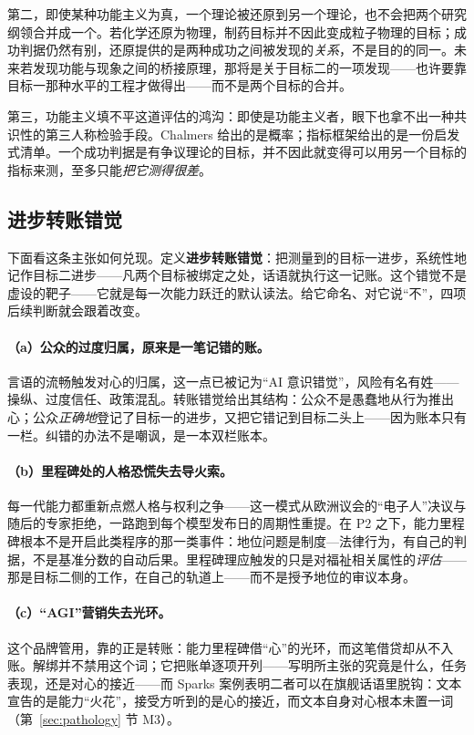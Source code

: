 \documentclass[10pt,fontset=fandol]{ctexart}
\begin{document}
第二，即使某种功能主义为真，一个理论被还原到另一个理论，也不会把两个研究纲领合并成一个。若化学还原为物理，制药目标并不因此变成粒子物理的目标；成功判据仍然有别，还原提供的是两种成功之间被发现的\emph{关系}，不是目的的同一。未来若发现功能与现象之间的桥接原理，那将是关于目标二的一项发现——也许要靠目标一那种水平的工程才做得出——而不是两个目标的合并。

第三，功能主义填不平这道评估的鸿沟：即使是功能主义者，眼下也拿不出一种共识性的第三人称检验手段。Chalmers 给出的是概率；指标框架给出的是一份启发式清单\cite{chalmers2023llm,butlin2023consciousness}。一个成功判据是有争议理论的目标，并不因此就变得可以用另一个目标的指标来测，至多只能\emph{把它测得很差}。

\subsection{进步转账错觉}\label{sec:illusion}

下面看这条主张如何兑现。定义\textbf{进步转账错觉}：把测量到的目标一进步，系统性地记作目标二进步——凡两个目标被绑定之处，话语就执行这一记账。这个错觉不是虚设的靶子——它就是每一次能力跃迁的默认读法。给它命名、对它说“不”，四项后续判断就会跟着改变。

\paragraph{（a）公众的过度归属，原来是一笔记错的账。}言语的流畅触发对心的归属，这一点已被记为“AI 意识错觉”，风险有名有姓——操纵、过度信任、政策混乱\cite{elmoznino2025illusions}。转账错觉给出其结构：公众不是愚蠢地从行为推出心；公众\emph{正确地}登记了目标一的进步，又把它错记到目标二头上——因为账本只有一栏。纠错的办法不是嘲讽，是一本双栏账本。

\paragraph{（b）里程碑处的人格恐慌失去导火索。}每一代能力都重新点燃人格与权利之争——这一模式从欧洲议会的“电子人”决议\cite{eu2017resolution}与随后的专家拒绝，一路跑到每个模型发布日的周期性重提。在 P2 之下，能力里程碑根本不是开启此类程序的那一类事件：地位问题是制度—法律行为，有自己的判据\cite{bostrom2014ethics,gunkel2018rights}，不是基准分数的自动后果。里程碑理应触发的只是对福祉相关属性的\emph{评估}——那是目标二侧的工作，在自己的轨道上\cite{long2024welfare,anthropic2025welfare}——而不是授予地位的审议本身。

\paragraph{（c）“AGI”营销失去光环。}这个品牌管用，靠的正是转账：能力里程碑借“心”的光环，而这笔借贷却从不入账。解绑并不禁用这个词；它把账单逐项开列——写明所主张的究竟是什么，任务表现，还是对心的接近——而 Sparks 案例表明二者可以在旗舰话语里脱钩：文本宣告的是能力“火花”，接受方听到的是心的接近，而文本自身对心根本未置一词（第~\ref{sec:pathology} 节 M3）。
\end{document}
